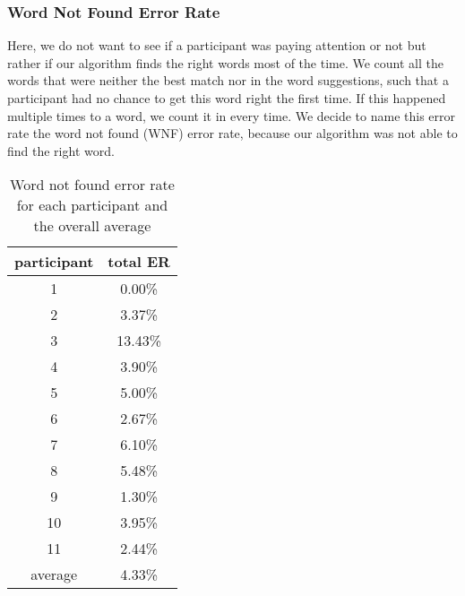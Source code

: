 \subsubsection{Word Not Found Error Rate}
Here, we do not want to see if a participant was paying attention or not but rather if our algorithm finds the right words most of the time. We count all the words that were neither the best match nor in the word suggestions, such that a participant had no chance to get this word right the first time. If this happened multiple times to a word, we count it in every time. We decide to name this error rate the word not found (WNF) error rate, because our algorithm was not able to find the right word.
\iffalse
\begin{figure}[H]
    \makebox[\textwidth][c]{
        \centering
        \subbottom[with characters\label{fig:error_system:error_system1}]{\texttt{[image: system\_error2\_1.png]}}\hspace{-3.0em}
        \subbottom[with words\label{fig:error_system:error_system2}]{\texttt{[image: system\_error2\_2.png]}}
    }
    \caption{percentage of characters/words that were not found by the system neither as best match nor as suggestion}
    \label{fig:error_system}
\end{figure}
\begin{figure}[H]
    \centering
    \texttt{[image: system\_error2\_2.pdf]}
    \caption{percentage of words that were not found by the system neither as best match nor as suggestion}
    \label{fig:error_system}
\end{figure}
\fi
\begin{table}[H]
    \centering
    \caption{Word not found error rate for each participant and the overall average}
    \begin{tabular}{cc} \toprule
        participant&total ER\\ \midrule
        1&0.00\%\\
        2&3.37\%\\
        3&13.43\%\\
        4&3.90\%\\
        5&5.00\%\\
        6&2.67\%\\
        7&6.10\%\\
        8&5.48\%\\
        9&1.30\%\\
        10&3.95\%\\
        11&2.44\%\\\bottomrule
        average&4.33\%\\
        \bottomrule
    \end{tabular}
    \label{tab:wnf_er}
\end{table}
